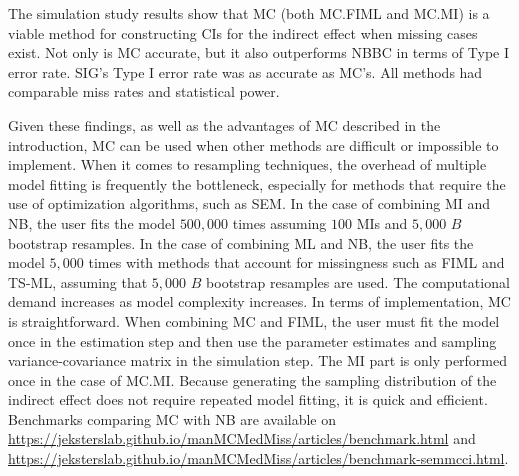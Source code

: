 \documentclass[man]{apa7}\usepackage[]{graphicx}\usepackage[]{xcolor}
\begin{document}
The simulation study results show that MC (both MC.FIML and MC.MI) is a viable method for constructing CIs for the indirect effect when missing cases exist.
Not only is MC accurate,
but it also outperforms NBBC in terms of Type I error rate.
SIG's Type I error rate was as accurate as MC's.
All methods had comparable miss rates and statistical power.

Given these findings,
as well as the advantages of MC described in the introduction,
MC can be used when other methods are difficult or impossible to implement.
When it comes to resampling techniques,
the overhead of multiple model fitting is frequently the bottleneck,
especially for methods that require the use of optimization algorithms,
such as SEM.
In the case of combining MI and NB,
the user fits the model $500,000$ times assuming $100$ MIs and $5,000$ $B$ bootstrap resamples.
In the case of combining ML and NB,
the user fits the model $5,000$ times with methods that account for missingness such as FIML and TS-ML,
assuming that $5,000$ $B$ bootstrap resamples are used.
The computational demand increases as model complexity increases.
In terms of implementation,
MC is straightforward.
When combining MC and FIML,
the user must fit the model once in the estimation step and then use the parameter estimates and sampling variance-covariance matrix in the simulation step.
The MI part is only performed once in the case of MC.MI.
Because generating the sampling distribution of the indirect effect does not require repeated model fitting,
it is quick and efficient.
Benchmarks comparing MC with NB are available on
\url{https://jeksterslab.github.io/manMCMedMiss/articles/benchmark.html} and \url{https://jeksterslab.github.io/manMCMedMiss/articles/benchmark-semmcci.html}.
\end{document}
